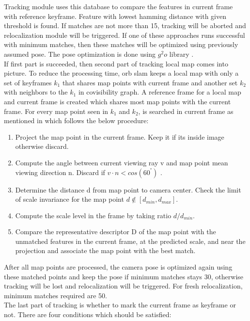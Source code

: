 Tracking module uses this database to compare the features in current frame with reference keyframe. Feature with lowest hamming distance with given threshold is found. If matches are not more than 15, tracking will be aborted and relocalization module will be triggered. If one of these approaches runs successful with minimum matches, then these matches will be optimized using previously assumed pose. The pose optimization is done using $ g^{2}o $ library \cite{g2o}. \\
\linebreak
If first part is succeeded, then second part of tracking local map comes into picture. To reduce the processing time, \acrshort{orb} \acrshort{slam} keeps a local map with only a set of keyframes $ k_{1} $ that shares map points with current frame and another set $k_{2} $ with neighbors to the $ k_{1} $ in covisibility graph. A reference frame for a local map and current frame is created which shares most map points with the current frame. For every map point seen in $ k_{1} $ and $ k_{2} $, is searched in current frame as mentioned in \cite{orbslam} which follows the below procedure: 
\begin{enumerate}
	\item Project the map point in the current frame. Keep it if its inside image otherwise discard.
	\item Compute the angle between current viewing ray v and map point mean viewing
	direction n. Discard if $ v \cdot n < cos(60^{°}) $ .
	\item Determine the distance d from map point to camera center. Check the limit of scale invariance for the map point $ d \notin [d_ {min} , d_{max}] $. 
	\item Compute the scale level in the frame by taking ratio $ d/d_{min} $.
	\item Compare the representative descriptor D of the map point with the unmatched features in the current frame, at the predicted scale, and near the projection and associate the map point with the best match.
\end{enumerate}
After all map points are processed, the camera pose is optimized again using these matched points and keep the pose if minimum matches stays 30, otherwise tracking will be lost and relocalization will be triggered. For fresh relocalization, minimum matches required are 50. \\
\newline
The last part of tracking is whether to mark the current frame as keyframe or not. There are four conditions which should be satisfied:
